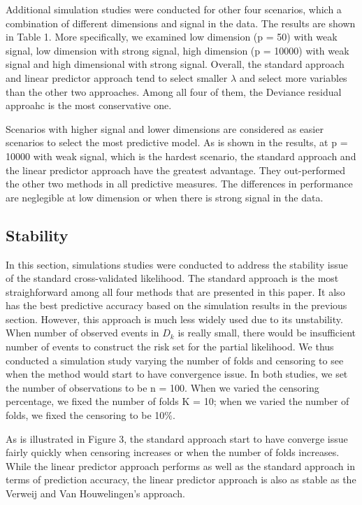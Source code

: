 \par Additional simulation studies were conducted for other four scenarios, which a combination of different dimensions and signal in the data. The results are shown in Table 1. More specifically, we examined low dimension (p = 50) with weak signal, low dimension with strong signal, high dimension (p = 10000) with weak signal and high dimensional with strong signal. Overall, the standard approach and linear predictor approach tend to select smaller $\lambda$ and select more variables than the other two approaches. Among all four of them, the Deviance residual approahc is the most conservative one.

\par Scenarios with higher signal and lower dimensions are considered as easier scenarios to select the most predictive model. As is shown in the results, at p = 10000 with weak signal, which is the hardest scenario, the standard approach and the linear predictor approach have the greatest advantage. They out-performed the other two methods in all predictive measures. The differences in performance are neglegible at low dimension or when there is strong signal in the data.

\subsection {Stability}
  
\par In this section, simulations studies were conducted to address the stability issue of the standard cross-validated likelihood. The standard approach is the most straighforward among all four methods that are presented in this paper. It also has the best predictive accuracy based on the simulation results in the previous section. However, this approach is much less widely used due to its unstability. When number of observed events in $D_k$ is really small, there would be insufficient number of events to construct the risk set for the partial likelihood. We thus conducted a simulation study varying the number of folds and censoring to see when the method would start to have convergence issue. In both studies, we set the number of observations to be n = 100. When we varied the censoring percentage, we fixed the number of folds K = 10; when we varied the number of folds, we fixed the censoring to be 10$\%$.
\par As is illustrated in Figure 3,  the standard approach start to have converge issue fairly quickly when censoring increases or when the number of folds increases. While the linear predictor approach performs as well as the standard approach in terms of prediction accuracy, the linear predictor approach is also as stable as the Verweij and Van Houwelingen's approach.

